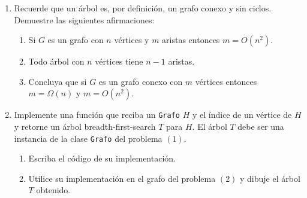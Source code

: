 \documentclass[12pt, a4paper]{article}
\begin{document}
\begin{enumerate}
\item{Recuerde que un \'arbol es, por definici\'on, un grafo conexo y sin ciclos. Demuestre las siguientes afirmaciones:
\begin{enumerate}
\item Si $G$ es un grafo con $n$ v\'ertices y $m$ aristas entonces $m=O(n^2)$.
\item Todo \'arbol con $n$ v\'ertices tiene $n-1$ aristas.
\item Concluya que si $G$ es un grafo conexo con $m$ v\'ertices entonces $m=\Omega(n)$ y $m=O(n^2)$.
\end{enumerate}
}


\item Implemente una funci\'on que reciba un \texttt{Grafo} $H$ y el \'indice de un v\'ertice de $H$ y retorne un árbol breadth-first-search $T$ para $H$. El árbol $T$ debe ser una instancia de la clase \texttt{Grafo} del problema $(1)$.

\begin{enumerate}
\item Escriba el c\'odigo de su implementaci\'on.
\item Utilice su implementaci\'on en el grafo del problema $(2)$ y dibuje el \'arbol $T$ obtenido.
\end{enumerate}


\end{enumerate}
\end{document}
